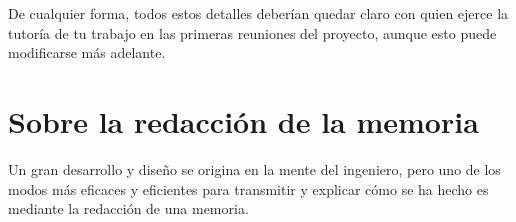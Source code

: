 De cualquier forma, todos estos detalles deberían quedar claro con quien ejerce la tutoría de tu trabajo en las primeras reuniones del proyecto, aunque esto puede modificarse más adelante. 







\section{Sobre la redacción de la memoria} %



Un gran desarrollo y diseño se origina en la mente del ingeniero, pero uno de los modos más eficaces y eficientes para transmitir y explicar cómo se ha hecho es mediante la redacción de una memoria. 

